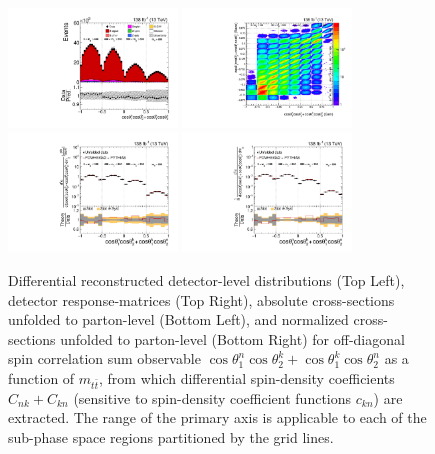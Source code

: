 \clearpage
\begin{figure}[htb]
\begin{center}
 \includegraphics[width=0.40\textwidth]{fig_fullRun2UL/controlplots/combined/Hyp_LLBarCPnk_vs_TTBarMass.pdf}
 \includegraphics[width=0.40\textwidth]{fig_fullRun2UL/unfolding/combined/ResponseMatrix_c_Pnk_mttbar.pdf} \\
 \includegraphics[width=0.40\textwidth]{fig_fullRun2UL/unfolding/combined/UnfoldedResults_c_Pnk_mttbar.pdf}
 \includegraphics[width=0.40\textwidth]{fig_fullRun2UL/unfolding/combined/UnfoldedResultsNorm_c_Pnk_mttbar.pdf} \\
\label{fig:c_Pnk_mttbar}
\caption{Differential reconstructed detector-level distributions (Top Left), detector response-matrices (Top Right), absolute cross-sections unfolded to parton-level (Bottom Left), and normalized cross-sections unfolded to parton-level (Bottom Right) for off-diagonal spin correlation sum observable $\cos\theta_{1}^{n}\cos\theta_{2}^{k}+\cos\theta_{1}^{k}\cos\theta_{2}^{n}$ as a function of $m_{t\bar{t}}$, from which differential spin-density coefficients $C_{nk}+C_{kn}$ (sensitive to spin-density coefficient functions $c_{k n}$) are extracted.  The range of the primary axis is applicable to each of the sub-phase space regions partitioned by the grid lines.}
\end{center}
\end{figure}
